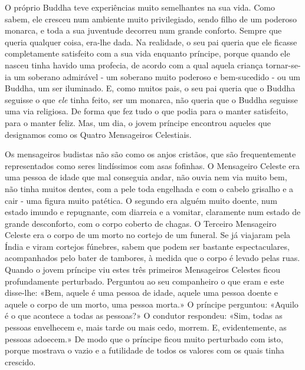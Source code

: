 O próprio Buddha teve experiências muito semelhantes na sua vida. Como
sabem, ele cresceu num ambiente muito privilegiado, sendo filho de um
poderoso monarca, e toda a sua juventude decorreu num grande conforto.
Sempre que queria qualquer coisa, era-lhe dada. Na realidade, o seu pai
queria que ele ficasse completamente satisfeito com a sua vida enquanto
príncipe, porque quando ele nasceu tinha havido uma profecia, de acordo
com a qual aquela criança tornar-se-ia um soberano admirável - um
soberano muito poderoso e bem-sucedido - ou um Buddha, um ser iluminado.
E, como muitos pais, o seu pai queria que o Buddha seguisse o que
\emph{ele} tinha feito, ser um monarca, não queria que o Buddha seguisse
uma via religiosa. De forma que fez tudo o que podia para o manter
satisfeito, para o manter feliz. Mas, um dia, o jovem príncipe encontrou
aqueles que designamos como os Quatro Mensageiros Celestiais.

Os mensageiros budistas não são como os anjos cristãos, que são
frequentemente representados como seres lindíssimos com asas fofinhas. O
Mensageiro Celeste era uma pessoa de idade que mal conseguia andar, não
ouvia nem via muito bem, não tinha muitos dentes, com a pele toda
engelhada e com o cabelo grisalho e a cair - uma figura muito patética.
O segundo era alguém muito doente, num estado imundo e repugnante, com
diarreia e a vomitar, claramente num estado de grande desconforto, com o
corpo coberto de chagas. O Terceiro Mensageiro Celeste era o corpo de um
morto no cortejo de um funeral. Se já viajaram pela Índia e viram
cortejos fúnebres, sabem que podem ser bastante espectaculares,
acompanhados pelo bater de tambores, à medida que o corpo é levado pelas
ruas. Quando o jovem príncipe viu estes três primeiros Mensageiros
Celestes ficou profundamente perturbado. Perguntou ao seu companheiro o
que eram e este disse-lhe: «Bem, aquele é uma pessoa de idade, aquele
uma pessoa doente e aquele o corpo de um morto, uma pessoa morta.» O
príncipe perguntou: «Aquilo é o que acontece a todas as pessoas?» O
condutor respondeu: «Sim, todas as pessoas envelhecem e, mais tarde ou
mais cedo, morrem. E, evidentemente, as pessoas adoecem.» De modo que o
príncipe ficou muito perturbado com isto, porque mostrava o vazio e a
futilidade de todos os valores com os quais tinha crescido.

